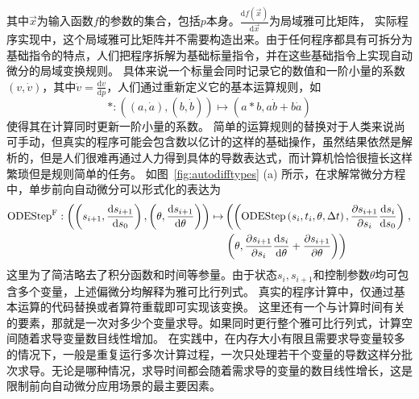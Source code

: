 \documentclass[A4,twoside,fontset=ubuntu,UTF8]{ctexart}
\def\D{\mathrm{d}}
\begin{document}
其中$\vec x$为输入函数$f$的参数的集合，包括$p$本身。$\frac{\D f(\vec x)}{\D \vec x}$为局域雅可比矩阵，
实际程序实现中，这个局域雅可比矩阵并不需要构造出来。由于任何程序都具有可拆分为基础指令的特点，人们把程序拆解为基础标量指令，并在这些基础指令上实现自动微分的局域变换规则。
具体来说一个标量会同时记录它的数值和一阶小量的系数$(v, \dot v)$，其中$\dot v = \frac{\D v}{\D p}$，人们通过重新定义它的基本运算规则，如
$$\texttt{*}: ((a, \dot a), (b, \dot b)) \mapsto (a * b, a \dot b + b \dot a)$$
使得其在计算同时更新一阶小量的系数。
简单的运算规则的替换对于人类来说尚可手动，但真实的程序可能会包含数以亿计的这样的基础操作，虽然结果依然是解析的，但是人们很难再通过人力得到具体的导数表达式，而计算机恰恰很擅长这样繁琐但是规则简单的任务。
如图~\ref{fig:autodifftypes} (a) 所示，在求解常微分方程中，单步前向自动微分可以形式化的表达为
\begin{align*}
    {\rm ODEStep}^{\rm F} : \left(\left(s_{i+1}, \frac{\D s_{i+1}}{\D s_0}\right), \left(\theta, \frac{\D s_{i+1}}{\D \theta}\right)\right)
        \mapsto &\left(\left({\rm ODEStep}\left(s_{i}, t_i, \theta, \Delta t \right), \frac{\partial s_{i+1}}{\partial s_i} \frac{\D s_{i}}{\D s_0}\right)\right., \\
        &\left.\left(\theta, \frac{\partial s_{i+1}}{\partial s_i} \frac{\D s_{i}}{\D \theta} + \frac{\partial s_{i+1}}{\partial \theta}\right)\right)
\end{align*}
这里为了简洁略去了积分函数和时间等参量。由于状态$s_i, s_{i+1}$和控制参数$\theta$均可包含多个变量，上述偏微分均解释为雅可比行列式。
真实的程序计算中，仅通过基本运算的代码替换或者算符重载即可实现该变换。
这里还有一个与计算时间有关的要素，那就是一次对多少个变量求导。如果同时更行整个雅可比行列式，计算空间随着求导变量数目线性增加。
在实践中，在内存大小有限且需要求导变量较多的情况下，一般是重复运行多次计算过程，一次只处理若干个变量的导数这样分批次求导。无论是哪种情况，求导时间都会随着需求导的变量的数目线性增长，这是限制前向自动微分应用场景的最主要因素。
\end{document}
